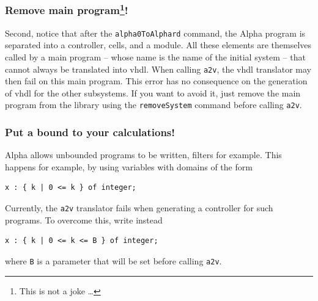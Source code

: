 \documentclass[12pt]{article}
\newcommand{\Alpha}{{\sc Alpha}}
\newcommand{\vhdl}{{\sc vhdl}}
\newcommand{\alfa}{\Alpha}
\begin{document}
\subsubsection*{Remove main program\footnote{This is not a joke \ldots}!}
Second, notice that after the \texttt{alpha0ToAlphard} command, the \alfa{} program
is separated into a controller, cells, and a module. All these elements are themselves
called by a main program -- whose name is the name of the initial system -- that cannot always
be translated into \vhdl{}. When calling \texttt{a2v}, the \vhdl{} translator may then fail on 
this main program. This error has no consequence on the generation of \vhdl{} for the other
subsystems. If you want to avoid it, just remove the main program from the library
using the \texttt{removeSystem} command before calling \texttt{a2v}.

\subsubsection*{Put a bound to your calculations!}
\alfa{} allows unbounded programs to be written, filters for example. This happens for example, 
by using variables with domains of the form
\begin{verbatim}
x : { k | 0 <= k } of integer;
\end{verbatim}
Currently, the \texttt{a2v} translator fails when generating a controller for such programs. 
To overcome this, write instead
\begin{verbatim}
x : { k | 0 <= k <= B } of integer;
\end{verbatim}
where \texttt{B} is a parameter that will be set before calling \texttt{a2v}.





\printindex

\newpage
\tableofcontents
\end{document}

